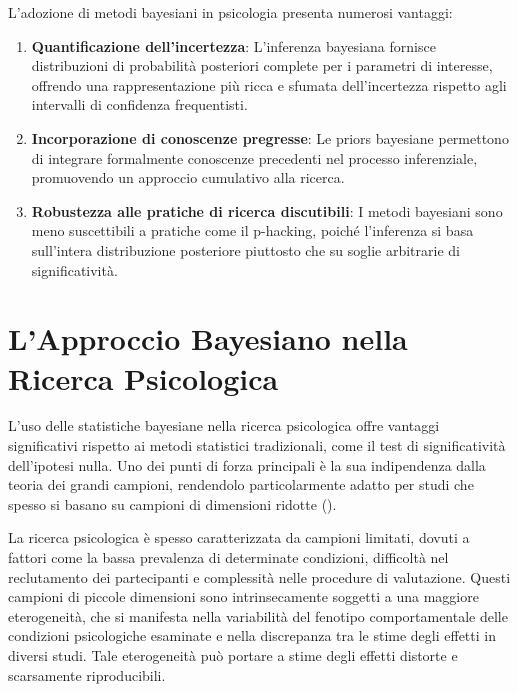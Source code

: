 \documentclass[
  letterpaper,
]{krantz}
\providecommand{\tightlist}{%
  \setlength{\itemsep}{0pt}\setlength{\parskip}{0pt}}\usepackage{longtable,booktabs,array}
\begin{document}
L'adozione di metodi bayesiani in psicologia presenta numerosi vantaggi:

\begin{enumerate}
\def\labelenumi{\arabic{enumi}.}
\tightlist
\item
  \textbf{Quantificazione dell'incertezza}: L'inferenza bayesiana
  fornisce distribuzioni di probabilità posteriori complete per i
  parametri di interesse, offrendo una rappresentazione più ricca e
  sfumata dell'incertezza rispetto agli intervalli di confidenza
  frequentisti.
\item
  \textbf{Incorporazione di conoscenze pregresse}: Le priors bayesiane
  permettono di integrare formalmente conoscenze precedenti nel processo
  inferenziale, promuovendo un approccio cumulativo alla ricerca.
\item
  \textbf{Robustezza alle pratiche di ricerca discutibili}: I metodi
  bayesiani sono meno suscettibili a pratiche come il p-hacking, poiché
  l'inferenza si basa sull'intera distribuzione posteriore piuttosto che
  su soglie arbitrarie di significatività.
\end{enumerate}

\section{L'Approccio Bayesiano nella Ricerca
Psicologica}\label{lapproccio-bayesiano-nella-ricerca-psicologica}

L'uso delle statistiche bayesiane nella ricerca psicologica offre
vantaggi significativi rispetto ai metodi statistici tradizionali, come
il test di significatività dell'ipotesi nulla. Uno dei punti di forza
principali è la sua indipendenza dalla teoria dei grandi campioni,
rendendolo particolarmente adatto per studi che spesso si basano su
campioni di dimensioni ridotte ().

La ricerca psicologica è spesso caratterizzata da campioni limitati,
dovuti a fattori come la bassa prevalenza di determinate condizioni,
difficoltà nel reclutamento dei partecipanti e complessità nelle
procedure di valutazione. Questi campioni di piccole dimensioni sono
intrinsecamente soggetti a una maggiore eterogeneità, che si manifesta
nella variabilità del fenotipo comportamentale delle condizioni
psicologiche esaminate e nella discrepanza tra le stime degli effetti in
diversi studi. Tale eterogeneità può portare a stime degli effetti
distorte e scarsamente riproducibili.
\end{document}

